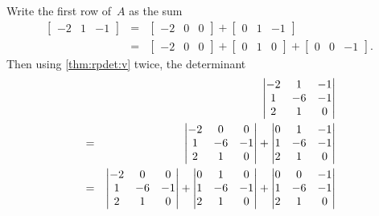 \begin{example}
\begin{solution} 
Write the first row of~\(A\) as the sum 
\begin{eqnarray*}
\begin{bmatrix}-2&1&-1\end{bmatrix} &=&\begin{bmatrix}-2&0&0\end{bmatrix}+\begin{bmatrix}0&1&-1\end{bmatrix} \\&=&\begin{bmatrix}-2&0&0\end{bmatrix}+\begin{bmatrix}0&1&0\end{bmatrix}+\begin{bmatrix}0&0&-1\end{bmatrix}.
\end{eqnarray*}
Then using \autoref{thm:rpdet:v} twice, the determinant
\begin{eqnarray*}&&\hspace{-1em}
\begin{vmatrix}   -2&1&-1
\\   1 & -6 & -1
\\   2 &  1 & 0
\end{vmatrix}
\\&=&\begin{vmatrix}   -2&0&0
\\   1 & -6 & -1
\\   2 &  1 & 0
\end{vmatrix}
+\begin{vmatrix}   0&1&-1
\\   1 & -6 & -1
\\   2 &  1 & 0
\end{vmatrix}
\\&=&\begin{vmatrix}   -2&0&0
\\   1 & -6 & -1
\\   2 &  1 & 0
\end{vmatrix}
+\begin{vmatrix}   0&1&0
\\   1 & -6 & -1
\\   2 &  1 & 0
\end{vmatrix}
+\begin{vmatrix}   0&0&-1
\\   1 & -6 & -1
\\   2 &  1 & 0
\end{vmatrix}

\end{eqnarray*}
\end{solution}
\end{example}
